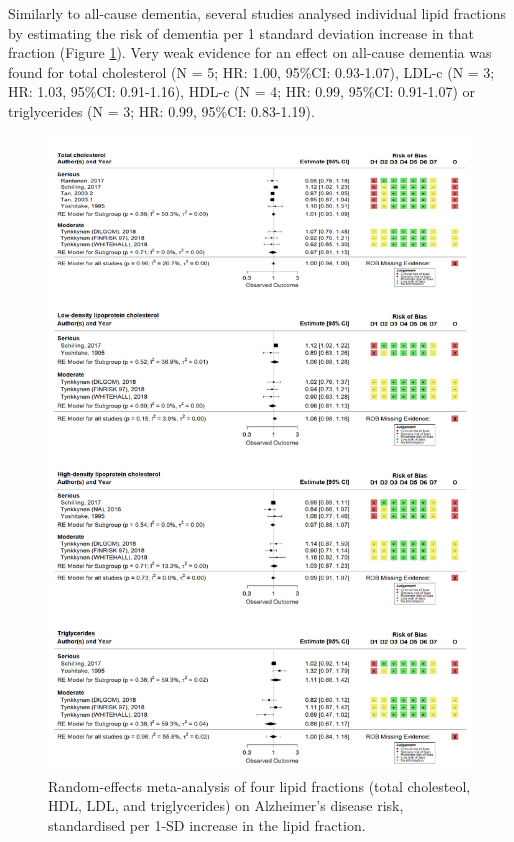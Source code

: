 \documentclass[a4paper, twoside]{templates/ociamthesis}
\begin{document}
Similarly to all-cause dementia, several studies analysed individual lipid fractions by estimating the risk of dementia per 1 standard deviation increase in that fraction (Figure \ref{fig:lipidFractionsAD}). Very weak evidence for an effect on all-cause dementia was found for total cholesterol (N = 5; HR: 1.00, 95\%CI: 0.93-1.07), LDL-c (N = 3; HR: 1.03, 95\%CI: 0.91-1.16), HDL-c (N = 4; HR: 0.99, 95\%CI: 0.91-1.07) or triglycerides (N = 3; HR: 0.99, 95\%CI: 0.83-1.19).





\begin{figure}[H]
\includegraphics[width=1\linewidth]{figures/sys-rev/fp_lipids_composite_AD} \caption[Random-effects meta-analysis of four lipid fractions on Alzheimer's disease]{Random-effects meta-analysis of four lipid fractions (total cholesteol, HDL, LDL, and triglycerides) on Alzheimer's disease risk, standardised per 1-SD increase in the lipid fraction.}\label{fig:lipidFractionsAD}
\end{figure}
\end{document}
